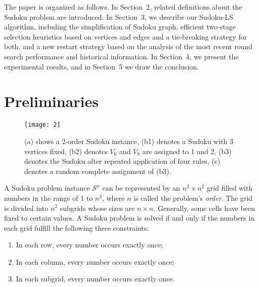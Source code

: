 \documentclass{article}
\begin{document}

The paper is organized as follows.
In Section~2, related definitions about the Sudoku problem are introduced.
In Section~3, we describe our Sudoku-LS algorithm, including the simplification of Sudoku graph, efficient two-stage selection heuristics based on vertices and edges and a tie-breaking strategy for both, and a new restart strategy based on the analysis of the most recent round search performance and historical information.
In Section~4, we present the experimental results, and in Section~5 we draw the conclusion.

\section{Preliminaries}

\begin{figure*}[t]
    \centering
    \texttt{[image: 2]}
    \caption{(a) shows a 2-order Sudoku instance, (b1) denotes a Sudoku with 3 vertices fixed, (b2) denotes $V_6$ and $V_8$ are assigned to 1 and 2, (b3) denotes the Sudoku after repeated application of four rules, (c) denotes a random complete assignment of (b3).}
    \label{fig:2}
\end{figure*}

A Sudoku problem instance $\mathcal{S}^n$ can be represented by an $n^2 \times n^2$ grid filled with numbers in the range of 1 to $n^2$, where $n$ is called the problem's {\it order}.
The grid is divided into $n^2$ subgrids whose sizes are $n \times n$. Generally, some cells have been fixed to certain values. A Sudoku problem is solved if and only if the numbers in each grid fulfill the following three constraints:
\begin{enumerate}
\renewcommand{\labelenumi}{\theenumi)}
    \item In each row, every number occurs exactly once;
    \item In each column, every number occurs exactly once;
    \item In each subgrid, every number occurs exactly once.
\end{enumerate}
\end{document}
